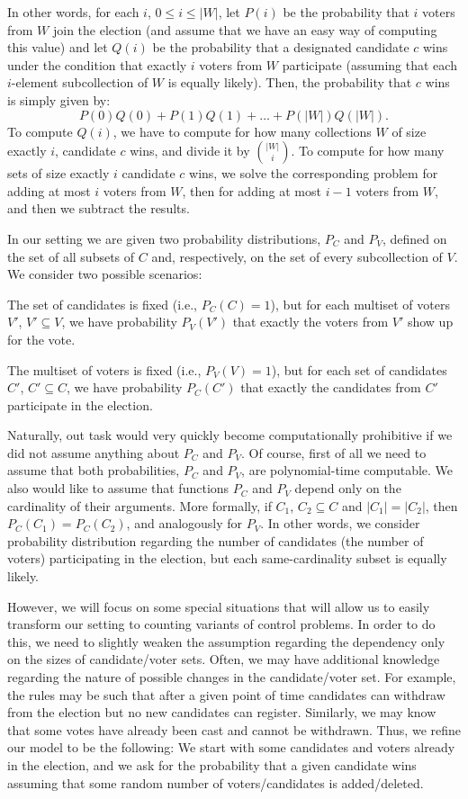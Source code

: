 In other words, for each $i$, $0\le i\le|W|$, let $P(i)$ be the probability that $i$ voters from $W$ join the election (and assume that we have an easy way of computing this value) and let $Q(i)$ be the probability that a designated candidate $c$ wins under the condition that exactly $i$ voters from $W$ participate (assuming that each $i$-element subcollection of $W$ is equally likely).
Then, the probability that $c$ wins is simply given by:
\[
	P(0)Q(0)+P(1)Q(1)+\dots+P(|W|)Q(|W|).
\]
To compute $Q(i)$, we have to compute for how many collections $W$ of size exactly $i$, candidate $c$ wins, and divide it by $\binom{|W|}{i}$.
To compute for how many sets of size exactly $i$ candidate $c$ wins, we solve the corresponding  problem for adding at most $i$ voters from $W$, then for adding at most $i-1$ voters from $W$, and then we subtract the results.

In our setting we are given two probability distributions, $P_C$ and $P_V$, defined on the set of all subsets of $C$ and, respectively, on the set of every subcollection of $V$.
We consider two possible scenarios:
\begin{Enumerate}
	\item The set of candidates is fixed (i.e., $P_C(C)=1$), but for each multiset of voters $V'$, $V'\subseteq V$, we have probability $P_V(V')$ that exactly the voters from $V'$ show up for the vote.
	\item The multiset of voters is fixed (i.e., $P_V(V)=1$), but for each set of candidates $C'$, $C'\subseteq C$, we have probability $P_C(C')$ that exactly the candidates from $C'$ participate in the election.
\end{Enumerate}

Naturally, out task would very quickly become computationally prohibitive if we did not assume anything about $P_C$ and $P_V$.
Of course, first of all we need to assume that both probabilities, $P_C$ and $P_V$, are polynomial-time computable.
We also would like to assume that functions $P_C$ and $P_V$ depend only on the cardinality of their arguments.
More formally, if $C_1$, $C_2\subseteq C$ and $|C_1|=|C_2|$, then $P_C(C_1)=P_C(C_2)$, and analogously for $P_V$.
In other words, we consider probability distribution regarding the number of candidates (the number of voters) participating in the election, but each same-cardinality subset is equally likely.

However, we will focus on some special situations that will allow us to easily transform our setting to counting variants of control problems.
In order to do this, we need to slightly weaken the assumption regarding the dependency only on the sizes of candidate/voter sets.
Often, we may have additional knowledge regarding the nature of possible changes in the candidate/voter set.
For example, the rules may be such that after a given point of time candidates can withdraw from the election but no new candidates can register.
Similarly, we may know that some votes have already been cast and cannot be withdrawn.
Thus, we refine our model to be the following:
We start with some candidates and voters already in the election, and we ask for the probability that a given candidate wins assuming that some random number of voters/candidates is added/deleted.

